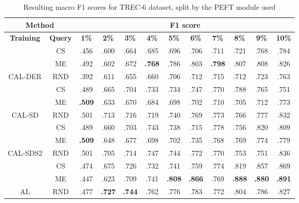 \begin{table}[htbp]
\begin{subtable}{\linewidth}
\begin{tabular}{c|c|cccccccccc}
\toprule
\multicolumn{2}{c|}{\textbf{Method}} & \multicolumn{10}{c}{\textbf{F1 score}} \\
\midrule
\textbf{Training} & \textbf{Query} & \textbf{1\%} & \textbf{2\%} & \textbf{3\%} & \textbf{4\%} & \textbf{5\%} & \textbf{6\%} & \textbf{7\%} & \textbf{8\%} & \textbf{9\%} & \textbf{10\%}\\
\midrule
 & CS & .456 & .600 & .664 & .685 & .696 & .706 & .711 & .721 & .768 & .784\\

 & ME & .492 & .602 & .672 & \textbf{.768} & .786 & .803 & \textbf{.798} & .807 & .808 & .826\\

\multirow{-3}{*}{\raggedright\arraybackslash CAL-DER} & RND & .392 & .611 & .655 & .660 & .706 & .712 & .715 & .712 & .723 & .763\\
\midrule
 & CS & .489 & .665 & .704 & .733 & .734 & .747 & .770 & .788 & .765 & .751\\

 & ME & \textbf{.509} & .633 & .670 & .684 & .698 & .702 & .710 & .705 & .712 & .773\\

\multirow{-3}{*}{\raggedright\arraybackslash CAL-SD} & RND & .501 & .713 & .716 & .719 & .740 & .769 & .773 & .766 & .777 & .832\\
\midrule
 & CS & .489 & .660 & .703 & .743 & .738 & .715 & .778 & .756 & .820 & .809\\

 & ME & \textbf{.509} & .648 & .677 & .698 & .702 & .735 & .768 & .769 & .774 & .779\\

\multirow{-3}{*}{\raggedright\arraybackslash CAL-SDS2} & RND & .501 & .705 & .714 & .747 & .744 & .772 & .770 & .753 & .751 & .836\\
\midrule
 & CS & .474 & .675 & .726 & .732 & .741 & .759 & .774 & .819 & .857 & .869\\

 & ME & .447 & .623 & .709 & .741 & \textbf{.808} & \textbf{.866} & .769 & \textbf{.888} & \textbf{.880} & \textbf{.891}\\

\multirow{-3}{*}{\raggedright\arraybackslash AL} & RND & .477 & \textbf{.727} & \textbf{.744} & .762 & .776 & .783 & .772 & .804 & .786 & .827\\
\bottomrule
\end{tabular}
\end{subtable}
\caption{Resulting macro F1 scores for TREC-6 dataset, split by the PEFT module used}
\label{tab:results_short_trec_10}
\end{table}
